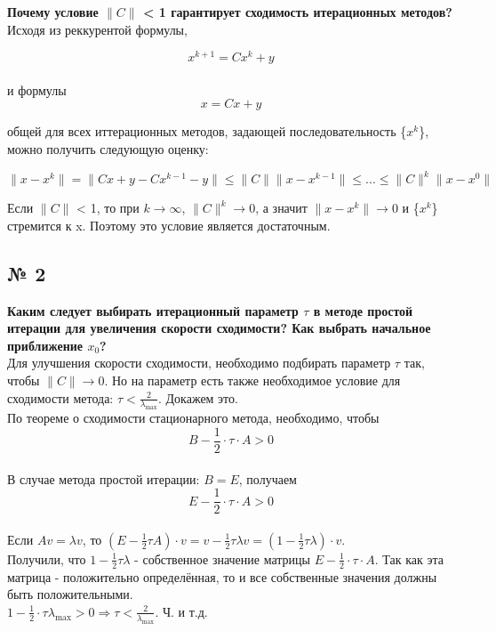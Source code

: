 \documentclass[a4paper, 14pt]{article}
\begin{document}
\textbf{Почему условие $\lVert C \rVert$ < 1 гарантирует сходимость итерационных методов?}\\

Исходя из реккурентой формулы,

\begin{equation}
 x^{k+1} = C x^{k} + y
 \end{equation}
 \\ и формулы 
 \begin{equation}
     x=Cx + y
 \end{equation}
 

общей для всех иттерационных методов, задающей последовательность \{$x^{k}$\}, можно получить следующую оценку:

\begin{equation}\label{estimate}
 \lVert x -  x^{k} \rVert = \lVert Cx + y -  Cx^{k-1} - y \rVert \leqslant  
 \lVert C\rVert \lVert x-x^{k-1}\rVert \leqslant ... \leqslant \lVert C \rVert ^{k} \lVert  x -  x^{0} \rVert
 \end{equation}

Если $\lVert C \rVert$ < 1, то при $k \rightarrow \infty$, $ \lVert C \rVert ^k \rightarrow 0$, а значит $\lVert x -  x^{k} \rVert \rightarrow 0$ и \{$x^{k}$\} стремится к x. Поэтому это условие является достаточным.

\subsection*{№ 2}

\textbf{Каким следует выбирать итерационный параметр $\tau$ в методе простой итерации для увеличения скорости сходимости? Как выбрать начальное приближение $x_0$?} \\

Для улучшения скорости сходимости, необходимо подбирать параметр $\tau$ так, чтобы $\lVert C \rVert \rightarrow 0$. Но на параметр есть также необходимое условие для сходимости метода: $\tau < \frac{2}{\lambda_{\max}}$. Докажем это.\\
По теореме о сходимости стационарного метода, необходимо, чтобы 
\begin{equation}
    B-\frac{1}{2} \cdot \tau \cdot A > 0
\end{equation}\\
В случае метода простой итерации: $B=E$, получаем 
\begin{equation}
    E-\frac{1}{2} \cdot \tau \cdot A > 0
\end{equation}\\
Если $Av=\lambda v$, то $(E-\frac{1}{2} \tau  A)\cdot v = v-\frac{1}{2} \tau \lambda v = (1-\frac{1}{2} \tau \lambda) \cdot v$.\\
Получили, что $1-\frac{1}{2} \tau \lambda$ - собственное значение матрицы $E-\frac{1}{2} \cdot \tau \cdot A$. Так как эта матрица - положительно определённая, то и все собственные значения должны быть положительными.\\
$1-\frac{1}{2} \cdot \tau \lambda_{\max} > 0 \Rightarrow \tau < \frac{2}{\lambda_{\max}}$. Ч. и т.д.\\
\end{document}
